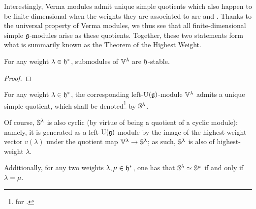         Interestingly, Verma modules admit unique simple quotients which also happen to be finite-dimensional when the weights they are associated to are  and . Thanks to the universal property of Verma modules, we thus see that all finite-dimensional simple $\mathfrak{g}$-modules arise as these quotients. Together, these two statements form what is summarily known as the Theorem of the Highest Weight. 
        \begin{lemma} \label{lemma: cartan_semi_simplicity_of_submodules_of_verma_modules}
            For any weight $\lambda \in \mathfrak{h}^*$, submodules of $\mathbb{V}^{\lambda}$ are $\mathfrak{h}$-stable.
        \end{lemma}
            \begin{proof}
                
            \end{proof}
        \begin{proposition} \label{prop: unique_simple_quotients_of_verma_modules}
            For any weight $\lambda \in \mathfrak{h}^*$, the corresponding left-$\mathrm{U}(\mathfrak{g})$-module $\mathbb{V}^{\lambda}$ admits a unique simple quotient, which shall be denoted\footnote{ for .} by $\mathbb{S}^{\lambda}$.
            
            Of course, $\mathbb{S}^{\lambda}$ is also cyclic (by virtue of being a quotient of a cyclic module): namely, it is generated as a left-$\mathrm{U}(\mathfrak{g})$-module by the image of the highest-weight vector $v(\lambda)$ under the quotient map $\mathbb{V}^{\lambda} \to \mathbb{S}^{\lambda}$; as such, $\mathbb{S}^{\lambda}$ is also of highest-weight $\lambda$. 

            Additionally, for any two weights $\lambda, \mu \in \mathfrak{h}^*$, one has that $\mathbb{S}^{\lambda} \simeq \mathbb{S}^{\mu}$ if and only if $\lambda = \mu$. 
        \end{proposition}
